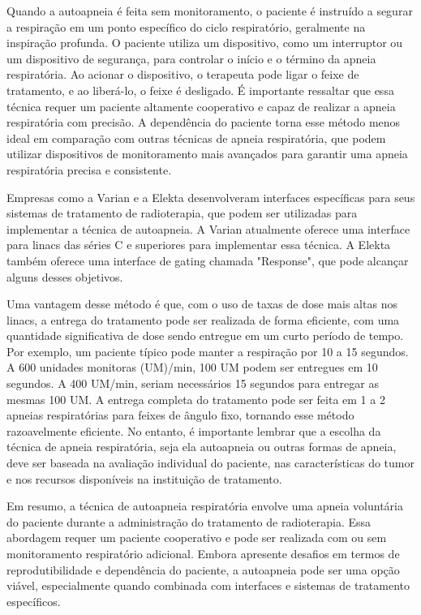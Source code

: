 \documentclass[11pt,a4paper]{article}
\newcounter{exemplo}
\begin{document}
	Quando a autoapneia é feita sem monitoramento, o paciente é instruído a segurar a respiração em um ponto específico do ciclo respiratório, geralmente na inspiração profunda. O paciente utiliza um dispositivo, como um interruptor ou um dispositivo de segurança, para controlar o início e o término da apneia respiratória. Ao acionar o dispositivo, o terapeuta pode ligar o feixe de tratamento, e ao liberá-lo, o feixe é desligado. É importante ressaltar que essa técnica requer um paciente altamente cooperativo e capaz de realizar a apneia respiratória com precisão. A dependência do paciente torna esse método menos ideal em comparação com outras técnicas de apneia respiratória, que podem utilizar dispositivos de monitoramento mais avançados para garantir uma apneia respiratória precisa e consistente.

	Empresas como a Varian e a Elekta desenvolveram interfaces específicas para seus sistemas de tratamento de radioterapia, que podem ser utilizadas para implementar a técnica de autoapneia. A Varian atualmente oferece uma interface para linacs das séries C e superiores para implementar essa técnica. A Elekta também oferece uma interface de gating chamada "Response", que pode alcançar alguns desses objetivos. 

	Uma vantagem desse método é que, com o uso de taxas de dose mais altas nos linacs, a entrega do tratamento pode ser realizada de forma eficiente, com uma quantidade significativa de dose sendo entregue em um curto período de tempo. Por exemplo, um paciente típico pode manter a respiração por 10 a 15 segundos. A 600 unidades monitoras (UM)/min, 100 UM podem ser entregues em 10 segundos. A 400 UM/min, seriam necessários 15 segundos para entregar as mesmas 100 UM. A entrega completa do tratamento pode ser feita em 1 a 2 apneias respiratórias para feixes de ângulo fixo, tornando esse método razoavelmente eficiente. No entanto, é importante lembrar que a escolha da técnica de apneia respiratória, seja ela autoapneia ou outras formas de apneia, deve ser baseada na avaliação individual do paciente, nas características do tumor e nos recursos disponíveis na instituição de tratamento. 


	Em resumo, a técnica de autoapneia respiratória envolve uma apneia voluntária do paciente durante a administração do tratamento de radioterapia. Essa abordagem requer um paciente cooperativo e pode ser realizada com ou sem monitoramento respiratório adicional. Embora apresente desafios em termos de reprodutibilidade e dependência do paciente, a autoapneia pode ser uma opção viável, especialmente quando combinada com interfaces e sistemas de tratamento específicos.
\end{document}

